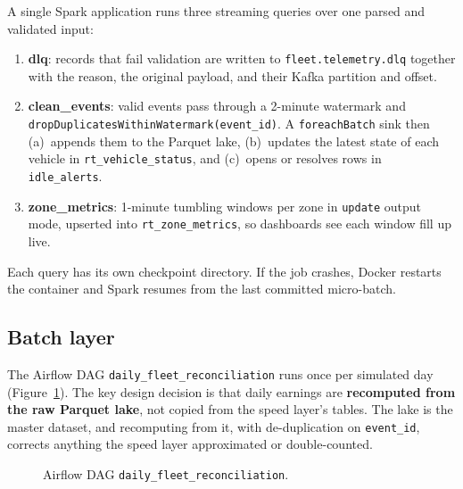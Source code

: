 \documentclass[11pt,a4paper]{article}
\newcommand{\code}[1]{\texttt{\small #1}}
\begin{document}
A single Spark application runs three streaming queries over one parsed and validated input:
\begin{enumerate}
  \item \textbf{dlq}: records that fail validation are written to \code{fleet.telemetry.dlq}
    together with the reason, the original payload, and their Kafka partition and offset.
  \item \textbf{clean\_events}: valid events pass through a 2-minute watermark and
    \code{dropDuplicatesWithinWatermark(event\_id)}. A \code{foreachBatch} sink then
    (a)~appends them to the Parquet lake, (b)~updates the latest state of each vehicle in
    \code{rt\_vehicle\_status}, and (c)~opens or resolves rows in \code{idle\_alerts}.
  \item \textbf{zone\_metrics}: 1-minute tumbling windows per zone in \code{update} output mode,
    upserted into \code{rt\_zone\_metrics}, so dashboards see each window fill up live.
\end{enumerate}
Each query has its own checkpoint directory. If the job crashes, Docker restarts the container and
Spark resumes from the last committed micro-batch.

\subsection{Batch layer}

The Airflow DAG \code{daily\_fleet\_reconciliation} runs once per simulated day
(Figure~\ref{fig:dag}). The key design decision is that daily earnings are \textbf{recomputed from
the raw Parquet lake}, not copied from the speed layer's tables. The lake is the master dataset,
and recomputing from it, with de-duplication on \code{event\_id}, corrects anything the speed layer
approximated or double-counted.

\begin{figure}[H]
\centering
{}
\caption{Airflow DAG \code{daily\_fleet\_reconciliation}.}
\label{fig:dag}
\end{figure}
\end{document}
